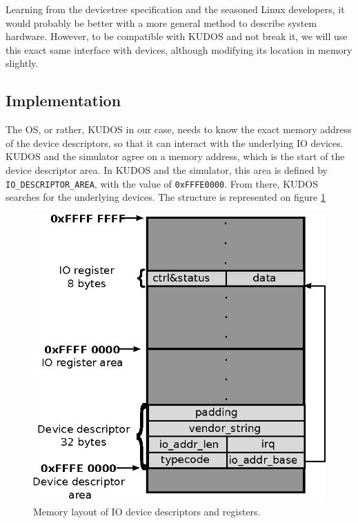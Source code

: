 Learning from the devicetree specification and the seasoned Linux developers,
it would probably be better with a more general method to describe system
hardware. However, to be compatible with KUDOS and not break it, we will use
this exact same interface with devices, although modifying its location in
memory slightly.


\subsection{Implementation}
The OS, or rather, KUDOS in our case, needs to know the exact memory address of
the device descriptors, so that it can interact with the underlying IO devices.
KUDOS and the simulator agree on a memory address, which is the start of the
device descriptor area. In KUDOS and the simulator, this area is defined by
\texttt{IO\_DESCRIPTOR\_AREA}, with the value of \texttt{0xFFFE0000}. From there,
KUDOS searches for the underlying devices. The structure is represented on figure
\ref{fig:io_memory_layout}

\begin{figure}[H]
	\centering
	\includegraphics[scale=1]{io/io_memory_layout.eps}
	\caption{Memory layout of IO device descriptors and registers.}
	\label{fig:io_memory_layout}
\end{figure}

